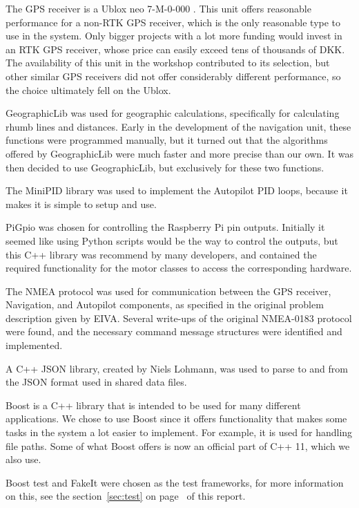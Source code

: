 The GPS receiver is a Ublox neo 7-M-0-000 \cite{ublox-datasheet}. This unit offers reasonable performance for a non-RTK GPS receiver, which is the only reasonable type to use in the system. Only bigger projects with a lot more funding would invest in an RTK GPS receiver, whose price can easily exceed tens of thousands of DKK. The availability of this unit in the workshop contributed to its selection, but other similar GPS receivers did not offer considerably different performance, so the choice ultimately fell on the Ublox.

GeographicLib\cite{geographiclib} was used for geographic calculations, specifically for calculating rhumb lines and distances. Early in the development of the navigation unit, these functions were programmed manually, but it turned out that the algorithms offered by GeographicLib were much faster and more precise than our own. It was then decided to use GeographicLib, but exclusively for these two functions.

The MiniPID \cite{minipid} library was used to implement the Autopilot PID loops, because it makes it is simple to setup and use.

PiGpio \cite{pigpio} was chosen for controlling the Raspberry Pi pin outputs. Initially it seemed like using Python scripts would be the way to control the outputs, but this C++ library was recommend by many developers, and contained the required functionality for the motor classes to access the corresponding hardware.

The NMEA \cite{NMEA} protocol was used for communication between the GPS receiver, Navigation, and Autopilot components, as specified in the original problem description given by EIVA. Several write-ups of the original NMEA-0183 protocol were found, and the necessary command message structures were identified and implemented.

A C++ JSON library, created by Niels Lohmann\cite{json}, was used to parse to and from the JSON format\cite{jsobjectnotation} used in shared data files.

Boost is a C++ library that is intended to be used for many different applications\cite{boost}. We chose to use Boost since it offers functionality that makes some tasks in the system a lot easier to implement. For example, it is used for handling file paths. Some of what Boost offers is now an official part of C++ 11, which we also use.

Boost test and FakeIt \cite{fakeit} were chosen as the test frameworks, for more information on this, see the section~\ref{sec:test} on page~\pageref{sec:test} of this report.